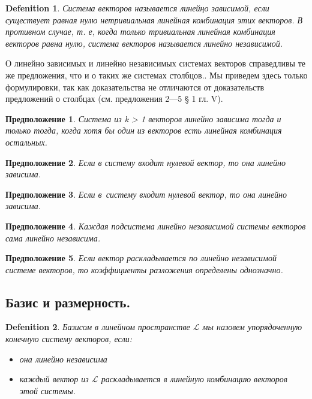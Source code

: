 \documentclass[11pt; a4paper]{report}
\theoremstyle{plain} %
\newtheorem{sug}{Предположение}[section]
\theoremstyle{defenition}
\newtheorem{glob_def}{Defenition}
\theoremstyle{remark}
\begin{document}
\begin{glob_def}
Система векторов называется линейңо зависимой, если существует равная нулю нетривиальная линейная комбинация этих векторов. В против­ном случае, т. е, когда только тривиальная линейная ком­бинация векторов равна нулю,  система векторов назы­вается линейно независимой. \\
\end{glob_def}

О линейно зависимых и линейно независимых систе­мах векторов справедливы те же предложения, что и о таких же системах столбцов.. Мы приведем здесь только формулировки, так как доказательства не отличаются от доказательств предложений о столбцах (см. предложения 2—5 § 1 гл. V). \\
\begin{sug}\label{6.1}
Система из k > 1 векторов линейно зависима тогда и только тогда, когда хотя бы один из векторов есть линейная комбинация остальных.\\
\end{sug}

\begin{sug}\label{sug6.2}
Если в систему входит нулевой вектор, то она линейно зависима.\\
\end{sug}

\begin{sug}\label{sug6.3}
Если в~систему входит нулевой вектор, то она линейно зависима.\\
\end{sug}

\begin{sug}\label{sug6.4}
Каждая подсистема линейно независимой системы векторов сама линейно независима.\\
\end{sug}

\begin{sug}\label{sug6.5}
Если вектор раскладывается по линейно неза­висимой системе векторов, то коэффициенты разложения определены однозначно.\\
\end{sug}

\subsection{Базис и размерность.}
\begin{glob_def}
Базисом в линейном пространстве $\mathscr{L}$  мы назо­вем упорядоченную конечную систему векторов, если:
\begin{itemize}
\item она линейно независима
\item каждый вектор из $\mathscr{L}$   раскладывается в линейную комбинацию векторов этой системы.
\end{itemize}
\end{glob_def}
\end{document}
